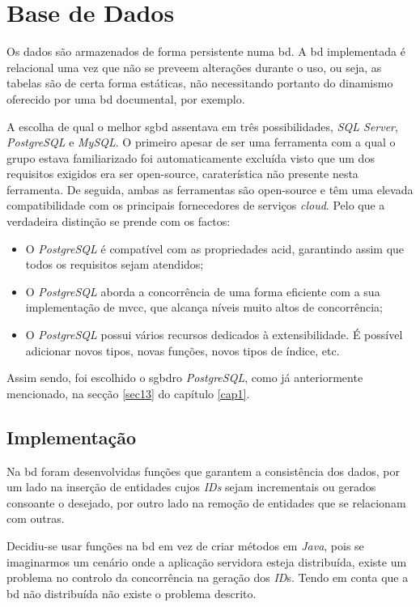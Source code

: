 %
%
\section{Base de Dados}\label{sec32}

Os dados são armazenados de forma persistente numa \acrfull{bd}. A \acrshort{bd} implementada é relacional uma vez que não se preveem alterações durante o uso, ou seja, as tabelas são de certa forma estáticas, não necessitando portanto do dinamismo oferecido por uma \acrshort{bd} documental, por exemplo. 

 A escolha de qual o melhor \acrfull{sgbd} assentava em três possibilidades, \textit{SQL Server}, \textit{PostgreSQL} e \textit{MySQL}. O primeiro apesar de ser uma ferramenta com a qual o grupo estava familiarizado foi automaticamente excluída visto que um dos requisitos exigidos era ser \gls{open-source}, caraterística não presente nesta ferramenta. De seguida, ambas as ferramentas são \gls{open-source} e têm uma elevada compatibilidade com os principais fornecedores de serviços \textit{cloud}. Pelo que a verdadeira distinção se prende com os factos:
 	\begin{itemize}
 		\item O \textit{PostgreSQL} é compatível com as propriedades \acrfull{acid}, garantindo assim que todos os requisitos sejam atendidos;
 		\item O \textit{PostgreSQL} aborda a concorrência de uma forma eficiente com a sua implementação de \acrfull{mvcc}, que alcança níveis muito altos de concorrência;
 		\item O \textit{PostgreSQL} possui vários recursos dedicados à extensibilidade. É possível adicionar novos tipos, novas funções, novos tipos de índice, etc.
	\end{itemize}
 Assim sendo, foi escolhido o \acrfull{sgbdro} \textit{PostgreSQL}, como já anteriormente mencionado, na secção \ref{sec13} do capítulo \ref{cap1}.
 
 \subsection{Implementação}\label{subsec321}
 
Na \acrshort{bd} foram desenvolvidas funções que garantem a consistência dos dados, por um lado na inserção de entidades cujos \textit{IDs} sejam incrementais ou gerados consoante o desejado, por outro lado na remoção  de entidades que se relacionam com outras.

Decidiu-se usar funções na \acrshort{bd} em vez de criar métodos em \textit{Java}, pois se imaginarmos um cenário onde a aplicação servidora esteja distribuída, existe um problema no controlo da concorrência na geração dos \textit{ID}s. Tendo em conta que a \acrshort{bd} não distribuída não existe o problema descrito.
